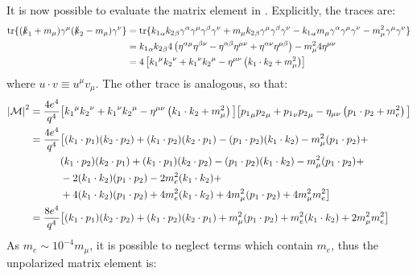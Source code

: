 It is now possible to evaluate the matrix element in . Explicitly, the traces are:
\begin{equation*}
  \begin{split}
    \operatorname{tr}\{(\slashed{k}_1 + m_\mu) \gamma^\mu (\slashed{k}_2 - m_\mu) \gamma^\nu\}
    & = \operatorname{tr}\{{k_1}_\alpha {k_2}_\beta \gamma^\alpha \gamma^\mu \gamma^\beta \gamma^\nu + m_\mu {k_2}_\beta \gamma^\mu \gamma^\beta \gamma^\nu - {k_1}_\alpha m_\mu \gamma^\alpha \gamma^\mu \gamma^\nu - m_\mu^2 \gamma^\mu \gamma^\nu\} \\
    & = {k_1}_\alpha {k_2}_\beta 4 \left( \eta^{\alpha \mu} \eta^{\beta \nu} - \eta^{\alpha \beta} \eta^{\mu \nu} + \eta^{\alpha \nu} \eta^{\mu \beta} \right) - m_\mu^2 4 \eta^{\mu \nu} \\
    & = 4 \left[ {k_1}^\mu {k_2}^\nu + {k_1}^\nu {k_2}^\mu - \eta^{\mu \nu} \left( k_1 \cdot k_2 + m_\mu^2 \right) \right]
  \end{split}
\end{equation*}
where $ u \cdot v \equiv u^\mu v_\mu $. The other trace is analogous, so that:
\begin{equation*}
  \begin{split}
    \left\lvert\mathcal{M}\right\rvert^2
    = \frac{4e^4}{q^4} & \big[ {k_1}^\mu {k_2}^\nu + {k_1}^\nu {k_2}^\mu - \eta^{\mu \nu} \left( k_1 \cdot k_2 + m_\mu^2 \right) \big] \big[ {p_1}_\mu {p_2}_\mu + {p_1}_\nu {p_2}_\mu - \eta_{\mu \nu} \left( p_1 \cdot p_2 + m_e^2 \right) \big] \\
    = \frac{4e^4}{q^4} & \big[ (k_1 \cdot p_1) (k_2 \cdot p_2) + (k_1 \cdot p_2) (k_2 \cdot p_1) - (p_1 \cdot p_2) (k_1 \cdot k_2) - m_\mu^2 (p_1 \cdot p_2) + \\
    & (k_1 \cdot p_2) (k_2 \cdot p_1) + (k_1 \cdot p_1) (k_2 \cdot p_2) - (p_1 \cdot p_2) (k_1 \cdot k_2) - m_\mu^2 (p_1 \cdot p_2) + \\
    & - 2 (k_1 \cdot k_2) (p_1 \cdot p_2) - 2 m_e^2 (k_1 \cdot k_2) + \\
    & + 4 (k_1 \cdot k_2) (p_1 \cdot p_2) + 4 m_e^2 (k_1 \cdot k_2) + 4 m_\mu^2 (p_1 \cdot p_2) + 4 m_\mu^2 m_e^2 \big] \\
    = \frac{8e^4}{q^4} & \big[ (k_1 \cdot p_1) (k_2 \cdot p_2) + (k_1 \cdot p_2) (k_2 \cdot p_1) + m_\mu^2 (p_1 \cdot p_2) + m_e^2 (k_1 \cdot k_2) + 2 m_\mu^2 m_e^2 \big] \\
  \end{split}
\end{equation*}
As $ m_e \sim 10^{-4} m_\mu $, it is possible to neglect terms which contain $ m_e $, thus the unpolarized matrix element is:

